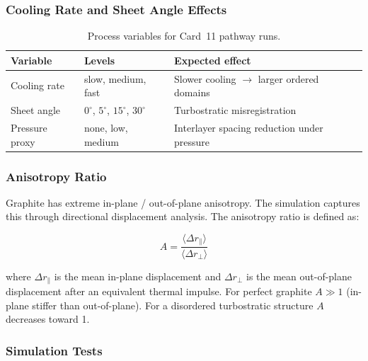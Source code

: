 \documentclass[12pt]{article}
\begin{document}
\subsubsection*{Cooling Rate and Sheet Angle Effects}

\begin{table}[H]
\centering
\caption{Process variables for Card~11 pathway runs.}
\label{tab:graphene_process}
\begin{tabular}{lll}
\toprule
\textbf{Variable} & \textbf{Levels} & \textbf{Expected effect} \\
\midrule
Cooling rate    & slow, medium, fast       & Slower cooling $\to$ larger ordered domains \\
Sheet angle     & $0^\circ$, $5^\circ$, $15^\circ$, $30^\circ$ & Turbostratic misregistration \\
Pressure proxy  & none, low, medium        & Interlayer spacing reduction under pressure \\
\bottomrule
\end{tabular}
\end{table}

\subsubsection*{Anisotropy Ratio}

Graphite has extreme in-plane / out-of-plane anisotropy.
The simulation captures this through directional displacement analysis.
The anisotropy ratio is defined as:

\begin{equation}
	A = \frac{\langle \Delta r_{\parallel} \rangle}{\langle \Delta r_{\perp} \rangle}
	\label{eq:graphene_anisotropy}
\end{equation}

\noindent where $\Delta r_{\parallel}$ is the mean in-plane displacement
and $\Delta r_{\perp}$ is the mean out-of-plane displacement after
an equivalent thermal impulse.
For perfect graphite $A \gg 1$ (in-plane stiffer than out-of-plane).
For a disordered turbostratic structure $A$ decreases toward 1.

\subsubsection*{Simulation Tests}
\end{document}
